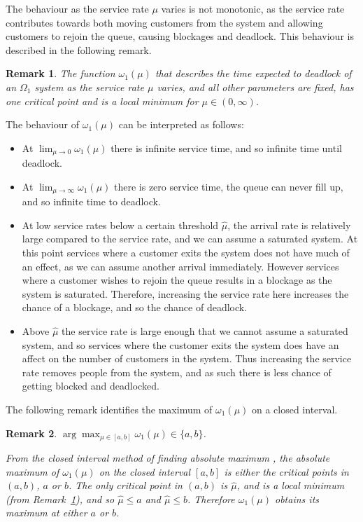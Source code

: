\documentclass{article}
\newtheorem{remark}{Remark}
\numberwithin{equation}{section}
\begin{document}
The behaviour as the service rate $\mu$ varies is not monotonic, as the service rate contributes towards both moving customers from the system and allowing customers to rejoin the queue, causing blockages and deadlock.
This behaviour is described in the following remark.\\

\begin{remark}\label{rem:oneminima}
The function $\omega_1(\mu)$ that describes the time expected to deadlock of an $\Omega_1$ system as the service rate $\mu$ varies, and all other parameters are fixed, has one critical point and is a local minimum for $\mu \in (0, \infty)$.
\end{remark}

The behaviour of $\omega_1(\mu)$ can be interpreted as follows:
\begin{itemize}
\item At $\lim_{\mu \to 0} \omega_1 (\mu)$ there is infinite service time, and so infinite time until deadlock.
\item At $\lim_{\mu \to \infty} \omega_1 (\mu)$ there is zero service time, the queue can never fill up, and so infinite time to deadlock.
\item At low service rates below a certain threshold $\hat{\mu}$, the arrival rate is relatively large compared to the service rate, and we can assume a saturated system.
At this point services where a customer exits the system does not have much of an effect, as we can assume another arrival immediately.
However services where a customer wishes to rejoin the queue results in a blockage as the system is saturated.
Therefore, increasing the service rate here increases the chance of a blockage, and so the chance of deadlock.
\item Above $\hat{\mu}$ the service rate is large enough that we cannot assume a saturated system, and so services where the customer exits the system does have an affect on the number of customers in the system.
Thus increasing the service rate removes people from the system, and as such there is less chance of getting blocked and deadlocked.
\end{itemize}

The following remark identifies the maximum of $\omega_1(\mu)$ on a closed interval.\\

\begin{remark}\label{rem:findmaximum}
$\arg\max_{\mu \in [a, b]} \omega_1(\mu) \in \{a, b\}$.

From the closed interval method of finding absolute maximum \cite{tan09}, the absolute maximum of $\omega_1(\mu)$ on the closed interval $[a, b]$ is either the critical points in $(a, b)$, $a$ or $b$.
The only critical point in $(a, b)$ is $\hat{\mu}$, and is a local minimum (from Remark~\ref{rem:oneminima}), and so $\hat{\mu} \leq a$ and $\hat{\mu} \leq b$.
Therefore $\omega_1(\mu)$ obtains its maximum at either $a$ or $b$.
\end{remark}
\end{document}
